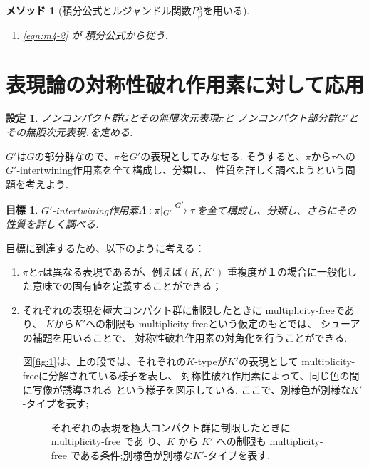 \documentclass[12pt]{article} %
\newcommand{\kana}[2]{#1}
\newcommand{\mysbo}{A:\pi\kern-0.1cm\mid_{G'}\xrightarrow{G'}\tau}
\newtheorem*{setting*}{\textbf{設定}}
\newtheorem*{goal*}{\textbf{目標}}
\newtheorem{method}{\textbf{メソッド}}
\theoremstyle{remark}
\begin{document}
{\begin{method}[積分公式とルジャンドル関数$ P^\alpha_\beta$を用いる]
\begin{enumerate}
		\item \eqref{eqn:m4-2} が \cite[L2]{kobayashi2011schrodinger}積分公式から従う.
	\end{enumerate}
\end{method}
\section{表現論の対称性破れ作用素に対して応用}
	\begin{setting*}
ノンコンパクト群$G$とその無限次元表現$\pi$と
ノンコンパクト部分群$G'$とその無限次元表現$\tau$を定める:\\
	\centerline{
		\xymatrixcolsep{0.5pc}
		\xymatrixrowsep{1pc}
		}
	\end{setting*}
$G'$は$G$の部分群なので、$\pi$を$G'$の表現としてみなせる.
そうすると、$\pi$から$\tau$への$G'$-intertwining作用素を全て構成し、分類し、
性質を詳しく調べようという問題を考えよう.
	\begin{goal*}
		$G'$-intertwining作用素$\mysbo$を全て構成し、分類し、さらにその性質を詳しく調べる.
	\end{goal*}
	目標に到達するため、以下のように考える：
	\begin{enumerate}
		\item $\pi$と$\tau$は異なる表現であるが、例えば$(K,K')$-重複度が１の場合に一般化した意味での固有値を定義することができる；
		\item
それぞれの表現を極大コンパクト群に制限したときに
multiplicity-freeであり、
$K$から$K'$への制限も multiplicity-freeという仮定のもとでは、
シューアの補題を用いることで、
対称性破れ作用素の\kana{対角化}{タイカクカ}を行うことができる.

図\ref{fig:1}は、上の段では、それぞれの$K$-typeが$K'$の表現として
multiplicity-freeに分解されている様子を表し、
対称性破れ作用素によって、同じ色の間に写像が誘導される
という様子を\kana{図示}{ずし}している.
ここで、別様色が別様な$K'$-タイプを表す;
\begin{figure}[h]
	\centering
	\begin{tikzpicture}[rotate=-90,scale=2]
	
	\end{tikzpicture}%
	\caption{
	それぞれの表現を極大コンパクト群に制限したときに multiplicity-free であ り、$K$ から $K'$ への制限も multiplicity-free
	である条件;別様色が別様な$K'$-タイプを表す.}


\end{figure}
\end{enumerate}}
\end{document}
